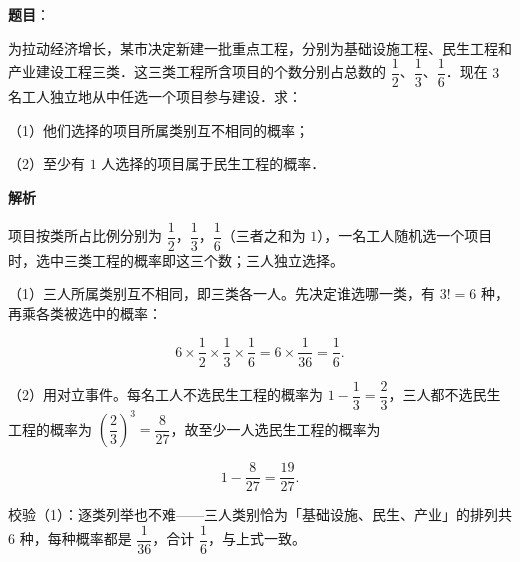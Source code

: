 \begin{answer}

\textbf{题目}：

为拉动经济增长，某市决定新建一批重点工程，分别为基础设施工程、民生工程和产业建设工程三类．这三类工程所含项目的个数分别占总数的 $\dfrac12$、$\dfrac13$、$\dfrac16$．现在 $3$ 名工人独立地从中任选一个项目参与建设．求：

（1）他们选择的项目所属类别互不相同的概率；

（2）至少有 $1$ 人选择的项目属于民生工程的概率．

\textbf{解析}

项目按类所占比例分别为 $\dfrac12$，$\dfrac13$，$\dfrac16$（三者之和为 $1$），一名工人随机选一个项目时，选中三类工程的概率即这三个数；三人独立选择。

（1）三人所属类别互不相同，即三类各一人。先决定谁选哪一类，有 $3!=6$ 种，再乘各类被选中的概率：

\nopagebreak[4]
\[6\times\frac12\times\frac13\times\frac16=6\times\frac1{36}=\frac16.\]

（2）用对立事件。每名工人不选民生工程的概率为 $1-\dfrac13=\dfrac23$，三人都不选民生工程的概率为 $\left(\dfrac23\right)^3=\dfrac8{27}$，故至少一人选民生工程的概率为

\nopagebreak[4]
\[1-\frac8{27}=\frac{19}{27}.\]

校验（1）：逐类列举也不难——三人类别恰为「基础设施、民生、产业」的排列共 $6$ 种，每种概率都是 $\dfrac1{36}$，合计 $\dfrac16$，与上式一致。


\end{answer}
